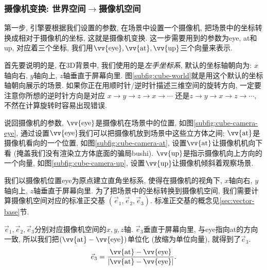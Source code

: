 \subsubsection{摄像机变换: 世界空间$\to$摄像机空间}

\def\eye{\vv{\text{eye}}}
\def\at{\vv{\text{at}}}
\def\up{\vv{\text{up}}}

第一步, 引擎要根据我们设置的参数, 在场景中设置一个摄像机,
把场景中的坐标转换成相对于摄像机的坐标, 这就是摄像机变换.
这一步需要用到的参数为eye, at和up, 对应着三个坐标,
我们用$\eye,\at,\up$三个向量来表示.

首先要说明的是, 在3D背景中, 我们使用的是\emph{左手坐标系},
默认的坐标轴朝向为: $x$轴向右, $y$轴向上, $z$轴垂直于屏幕向里.
图\ref{subfig:cube-world}就是用这个默认的坐标轴朝向展示的场景.
如果你正在用顺时针/逆时针描述三维空间的旋转方向,
一定要注意你所想的逆时针方向是对应
$x\to y\to z\to x\to\cdots$
还是$z\to y\to x\to z\to\cdots$,
不然在计算旋转时容易出现错误.

说回摄像机的参数, $\eye$是摄像机在场景中的位置,
如图\ref{subfig:cube-camera-eye},
通过设置$\eye$我们可以把摄像机放到场景中这些立方体之间;
$\at$是摄像机看向的一个位置,
如图\ref{subfig:cube-camera-at},
设置$\at$让摄像机机向下看 (掩盖我们没有渲染立方体底面的骗局bushi).
$\up$是指示摄像机向上方向的一个向量,
如图\ref{subfig:cube-camera-up},
设置$\up$让摄像机倾斜着观察场景.

\begin{center}
\end{center}

我们以摄像机位置eye为原点建立直角坐标系,
使得在摄像机的视角下, $x$轴向右, $y$轴向上, $z$轴垂直于屏幕向里.
为了把场景中的坐标转换到摄像机空间,
我们需要计算摄像机空间对应的标准正交基
$(\vec e_1,\vec e_2,\vec e_3)$.
标准正交基的概念见\ref{sec:vector-base}节.

$\vec e_1,\vec e_2,\vec e_3$分别对应摄像机空间的$x,y,z$轴.
$\vec e_3$垂直于屏幕向里, 与eye指向at的方向一致,
所以我们把$(\at-\eye)$单位化 (放缩为单位向量), 就得到了$\vec e_3$.
\[
  \vec e_3 = \dfrac{\at-\eye}{|\at-\eye|}.
\]

